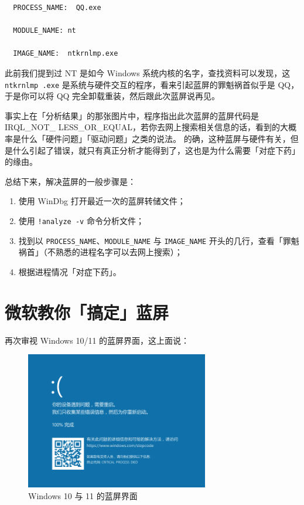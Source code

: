 \begin{Verbatim}
  PROCESS_NAME:  QQ.exe
  
  MODULE_NAME: nt
  
  IMAGE_NAME:  ntkrnlmp.exe
\end{Verbatim}

此前我们提到过 NT 是如今 Windows 系统内核的名字，查找资料可以发现，这 \texttt{ntkrnlmp .exe} 是系统与硬件交互的程序，看来引起蓝屏的罪魁祸首似乎是 QQ，于是你可以将 QQ 完全卸载重装，然后跟此次蓝屏说再见。

事实上在「分析结果」的那张图片中，程序指出此次蓝屏的蓝屏代码是 IRQL\_{}NOT\_{} LESS\_{}OR\_{}EQUAL，若你去网上搜索相关信息的话，看到的大概率是什么「硬件问题」「驱动问题」之类的说法。
的确，这种蓝屏与硬件有关，但是什么引起了错误，就只有真正分析才能得到了，这也是为什么需要「对症下药」的缘由。

总结下来，解决蓝屏的一般步骤是：

\begin{enumerate}
  \item 使用 WinDbg 打开最近一次的蓝屏转储文件；
  \item 使用 \verb|!analyze -v| 命令分析文件；
  \item 找到以 \verb|PROCESS_NAME|、\verb|MODULE_NAME| 与 \verb|IMAGE_NAME| 开头的几行，查看「罪魁祸首」（不熟悉的进程名字可以去网上搜索）；
  \item 根据进程情况「对症下药」。
\end{enumerate}

\section{微软教你「搞定」蓝屏}

\begin{note}
\end{note}

再次审视 Windows 10/11 的蓝屏界面，这上面说：

\begin{figure}[htb!]
  \centering
  \includegraphics[width=8cm]{assets/Win-10-BSoD.png}
  \caption{Windows 10 与 11 的蓝屏界面}
  \label{Win-10-BSoD-2}
\end{figure}

